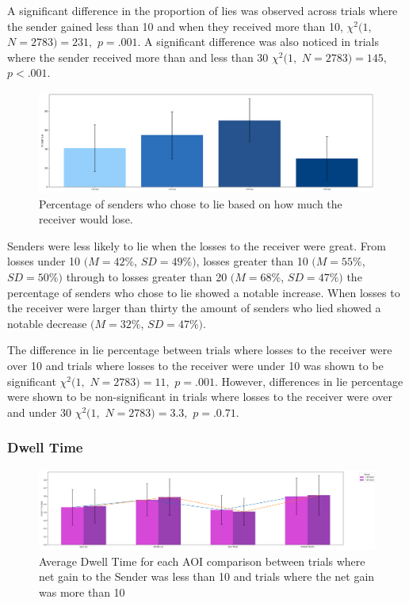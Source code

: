 \documentclass[man, floatsintext]{apa7}
\begin{document}
A significant difference in the proportion of lies was observed across trials where the sender gained less than 10 and when they received more than 10, $\chi^2(1,$ $N=2783) = 231,$ $p=.001$. A significant difference was also noticed in trials where the sender received more than and less than 30 $\chi^2(1,$ $N=2783) = 145,$ $p<.001$.

\begin{figure}[H]
	\includegraphics[width=\linewidth]{../plots/RESPONSE/NetLossLie.png}
	\caption{Percentage of senders who chose to lie based on how much the receiver would lose.}
	\label{fig:NetLossLie}
\end{figure}

Senders were less likely to lie when the losses to the receiver were great. From losses under 10 $(M = 42\%$, $SD = 49\%)$, losses greater than 10 $(M = 55\%$, $SD = 50\%)$ through to losses greater than 20 $(M = 68\%$, $SD = 47\%)$ the percentage of senders who chose to lie showed a notable increase. When losses to the receiver were larger than thirty the amount of senders who lied showed a notable decrease $(M = 32\%$, $SD = 47\%)$. 

The difference in lie percentage between trials where losses to the receiver were over 10 and trials where losses to the receiver were under 10 was shown to be significant $\chi^2(1,$ $N=2783) = 11,$ $p=.001$. However, differences in lie percentage were shown to be non-significant in trials where losses to the receiver were over and under 30 $\chi^2(1,$ $N=2783) = 3.3,$ $p=.0.71$.

\subsubsection{Dwell Time}

\begin{figure}[H]
	\includegraphics[width=\linewidth]{../plots/RESPONSE/AvgDwellPerGain.png}
	\caption{Average Dwell Time for each AOI comparison between trials where net gain to the Sender was less than 10 and trials where the net gain was more than 10}
	\label{fig:AvgDwellPerGain}
\end{figure}
\end{document}

